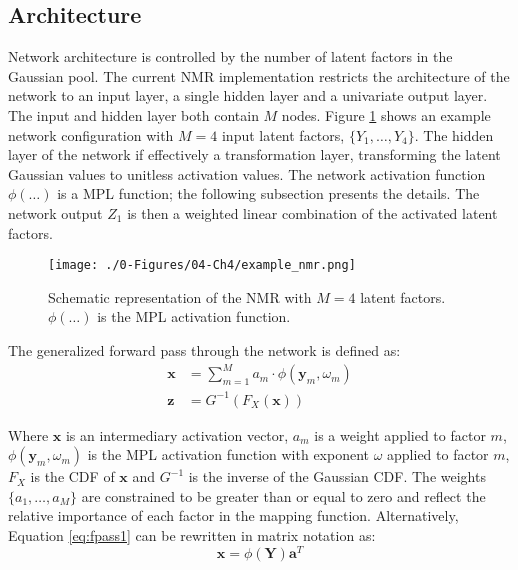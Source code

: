 \subsection{Architecture}
\label{subsec:04arch}

Network architecture is controlled by the number of latent factors in the Gaussian pool. The current \gls{NMR} implementation restricts the architecture of the network to an input layer, a single hidden layer and a univariate output layer. The input and hidden layer both contain $M$ nodes. Figure \ref{fig:example_nmr} shows an example network configuration with $M=4$ input latent factors, $\{ Y_{1}, \dots, Y_{4}\}$. The hidden layer of the network if effectively a transformation layer, transforming the latent Gaussian values to unitless activation values. The network activation function $\phi(\dots)$ is a \gls{MPL} function; the following subsection presents the details. The network output $Z_{1}$ is then a weighted linear combination of the activated latent factors.

\begin{figure}[htb!]
    \centering
    \texttt{[image: ./0-Figures/04-Ch4/example\_nmr.png]}
    \caption{Schematic representation of the \gls{NMR} with $M=4$ latent factors. $\phi(\dots)$ is the \gls{MPL} activation function. }
    \label{fig:example_nmr}
\end{figure}

The generalized forward pass through the network is defined as:
\begin{align}
    \label{eq:fpass1}
    \mathbf{x} & = \sum_{m=1}^{M}a_{m} \cdot \phi(\mathbf{y}_{m}, \omega_{m}) \\
    \label{eq:fpass2}
    \mathbf{z} & = G^{-1}\left( F_{X}\left(\mathbf{x} \right)\right)
\end{align}

Where $\mathbf{x}$ is an intermediary activation vector, $a_{m}$ is a weight applied to factor $m$, $\phi(\mathbf{y}_{m}, \omega_{m})$ is the \gls{MPL} activation function with exponent $\omega$ applied to factor $m$, $F_{X}$ is the \gls{CDF} of $\mathbf{x}$ and $G^{-1}$ is the inverse of the Gaussian \gls{CDF}. The weights $\{ a_{1}, \dots, a_{M}\}$ are constrained to be greater than or equal to zero and reflect the relative importance of each factor in the mapping function. Alternatively, Equation \ref{eq:fpass1} can be rewritten in matrix notation as:
\begin{equation}
    \mathbf{x} = \phi\left( \mathbf{Y} \right) \mathbf{a}^{T}
    \label{eq:fpass3}
\end{equation}

